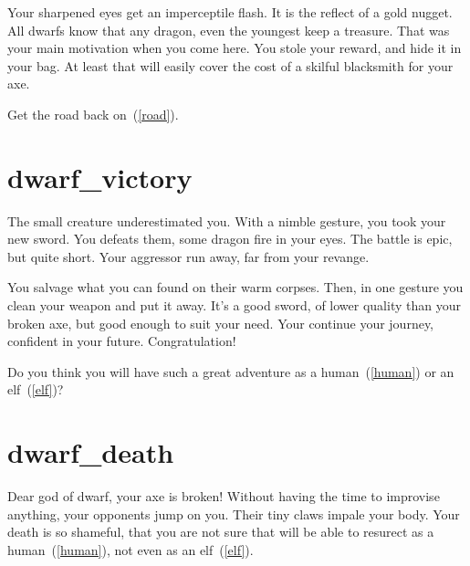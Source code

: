 Your sharpened eyes get an imperceptile flash. It is the reflect of a gold
nugget. All dwarfs know that any dragon, even the youngest keep a treasure. That
was your main motivation when you come here. You stole your reward, and hide it
in your bag. At least that will easily cover the cost of a skilful blacksmith
for your axe.

Get the road back on~(\ref{road}).

\section{dwarf_victory}

The small creature underestimated you. With a nimble gesture, you took your new
sword. You defeats them, some dragon fire in your eyes. The battle is epic, but
quite short. Your aggressor run away, far from your revange.

You salvage what you can found on their warm corpses. Then, in one gesture you
clean your weapon and put it away. It's a good sword, of lower quality than your
broken axe, but good enough to suit your need. Your continue your journey,
confident in your future. Congratulation!

Do you think you will have such a great adventure as a human~(\ref{human}) or
an elf~(\ref{elf})?

\section{dwarf_death}

Dear god of dwarf, your axe is broken! Without having the time to improvise
anything, your opponents jump on you. Their tiny claws impale your body. Your
death is so shameful, that you are not sure that will be able to resurect as a
human~(\ref{human}), not even as an elf~(\ref{elf}).
